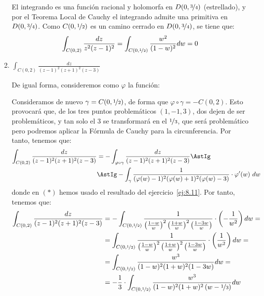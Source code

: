 \begin{ejercicio}
\begin{enumerate}
        El integrando es una función racional y holomorfa en $D(0,\nicefrac{3}{4})$ (estrellado), y por el Teorema Local de Cauchy el integrando admite una primitiva en $D(0,\nicefrac{3}{4})$. Como $C(0,\nicefrac{1}{2})$ es un camino cerrado en $D(0,\nicefrac{3}{4})$, se tiene que:
        \begin{equation*}
            \int_{C(0,2)} \frac{dz}{z^2(z-1)^2} = \int_{C(0,\nicefrac{1}{2})}\frac{w^2}{(1-w)^2} dw = 0
        \end{equation*}

        \item $\displaystyle\int_{C(0,2)} \frac{dz}{(z-1)^2(z+1)^2(z-3)}$
        
        De igual forma, consideremos como $\varphi$ la función:

        Consideramos de nuevo $\gamma=C(0,\nicefrac{1}{2})$, de forma que $\varphi\circ\gamma=-C(0,2)$. Esto provocará que, de los tres puntos problemáticos $(1,-1,3)$, dos dejen de ser problemáticos, y tan solo el $3$ se transformará en el $\nicefrac{1}{3}$, que será problemático pero podremos aplicar la Fórmula de Cauchy para la circunferencia. Por tanto, tenemos que:
        \begin{align*}
            \int_{C(0,2)} \frac{dz}{(z-1)^2(z+1)^2(z-3)} &= -\int_{\varphi\circ\gamma}\frac{dz}{(z-1)^2(z+1)^2(z-3)} \AstIg\\&\AstIg -\int_{\gamma}\frac{1}{(\varphi(w)-1)^2(\varphi(w)+1)^2(\varphi(w)-3)} \cdot \varphi'(w)\ dw
        \end{align*}
        donde en $(\ast)$ hemos usado el resultado del ejercicio~\ref{ej:8.11}. Por tanto, tenemos que:
        \begin{align*}
            \int_{C(0,2)} \frac{dz}{(z-1)^2(z+1)^2(z-3)} &= -\int_{C(0,\nicefrac{1}{2})}\frac{1}{\left(\frac{1-w}{w}\right)^2\left(\frac{1+w}{w}\right)^2\left(\frac{1-3w}{w}\right)} \cdot \left(-\frac{1}{w^2}\right) dw
            =\\&= \int_{C(0,\nicefrac{1}{2})}\frac{1}{\left(\frac{1-w}{w}\right)^2\left(\frac{1+w}{w}\right)^2\left(\frac{1-3w}{w}\right)}  \cdot \left(\frac{1}{w^2}\right) dw
            =\\&= \int_{C(0,\nicefrac{1}{2})}\frac{w^3}{(1-w)^2(1+w)^2(1-3w)} dw
            =\\&= -\dfrac{1}{3}\cdot \int_{C(0,\nicefrac{1}{2})}\frac{w^3}{(1-w)^2(1+w)^2\left(w-\nicefrac{1}{3}\right)} dw
        \end{align*}


\end{enumerate}
\end{ejercicio}
